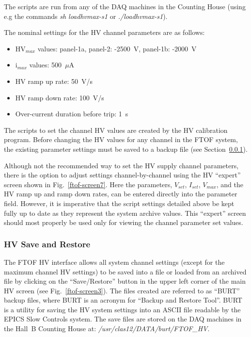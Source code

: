 \documentclass[12pt]{article}
\begin{document}
The scripts are run from any of the DAQ machines in the Counting House (using e.g the
commands {\it sh loadhvmax-s1} or {\it ./loadhvmax-s1}).

The nominal settings for the HV channel parameters are as follows:

\begin{itemize}
\item HV$_{max}$ values: panel-1a, panel-2: -2500~V, panel-1b: -2000~V
\item i$_{max}$ values: 500~$\mu$A
\item HV ramp up rate: 50~V/s
\item HV ramp down rate: 100~V/s
\item Over-current duration before trip: 1~s
\end{itemize}

The scripts to set the channel HV values are created by the HV calibration program. 
Before changing the HV values for any channel in the FTOF system, the existing parameter 
settings must be saved to a backup file (see Section~\ref{save-restore}).

Although not the recommended way to set the HV supply channel parameters, there is the 
option to adjust settings channel-by-channel using the HV ``expert'' screen shown in 
Fig.~\ref{ftof-screen7}. Here the parameters, $V_{set}$, $I_{set}$, $V_{max}$, and the HV 
ramp up and ramp down rates, can be entered directly into the parameter field. However, 
it is imperative that the script settings detailed above be kept fully up to date as 
they represent the system archive values. This ``expert'' screen should most properly 
be used only for viewing the channel parameter set values.

\subsubsection{HV Save and Restore}
\label{save-restore}

The FTOF HV interface allows all system channel settings (except for the maximum channel
HV settings) to be saved into a file or loaded from an archived file by clicking on the
``Save/Restore'' button in the upper left corner of the main HV screen (see
Fig.~\ref{ftof-screen3}). The files created are referred to as ``BURT'' backup files, where
BURT is an acronym for ``Backup and Restore Tool''. BURT is a utility for saving the HV system
settings into an ASCII file readable by the EPICS Slow Controls system. The save files are
stored on the DAQ machines in the Hall~B Counting House at:
{\it /usr/clas12/DATA/burt/FTOF\_HV}.
\end{document}
